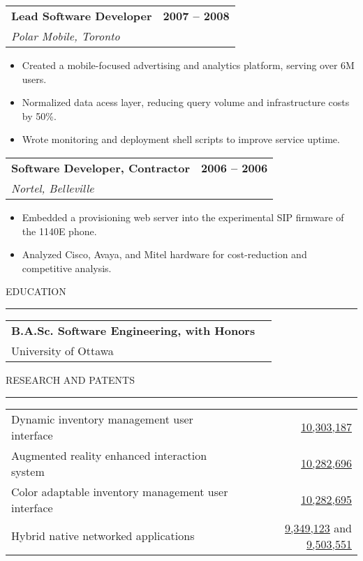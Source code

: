 \documentclass[12pt]{article}
\makeatletter
\newenvironment{justifycolumns}
{\begin{tabular*}{\textwidth}{@{\extracolsep{\fill}}lr@{}}}
{\end{tabular*}}
\newcommand{\row}[2]{#1 & #2 \\}
\newcommand{\rowheading}[2]{\row{\textbf{#1}}{\textbf{#2}}}
\newcommand{\range}[2]{#1 -- #2}
\newcommand{\blockseparation}{\vspace{0.15in}}
\newcommand{\heading}[1]{
	\blockseparation
	\uppercase{#1}
	\vspace{0.05in}
	\hrule
	\blockseparation
}
\newenvironment{tightbullets}
{\begin{itemize}}
{\end{itemize}}
\newenvironment{bullets}
{\begin{tightbullets}}
{\end{tightbullets} \blockseparation}
\makeatother
\begin{document}
\begin{flushleft}
\begin{justifycolumns}
	\rowheading{Lead Software Developer}{\range{2007}{2008}}
	\row{\emph{Polar Mobile, Toronto}}{}
\end{justifycolumns}
\begin{bullets}
	\item Created a mobile-focused advertising and analytics platform, serving over 6M users.
	\item Normalized data acess layer, reducing query volume and infrastructure costs by 50\%.
	\item Wrote monitoring and deployment shell scripts to improve service uptime.
\end{bullets}

\begin{justifycolumns}
	\rowheading{Software Developer, Contractor}{\range{2006}{2006}}
	\row{\emph{Nortel, Belleville}}{}
\end{justifycolumns}
\begin{bullets}
	\item Embedded a provisioning web server into the experimental SIP firmware of the 1140E phone.
	\item Analyzed Cisco, Avaya, and Mitel hardware for cost-reduction and competitive analysis.
\end{bullets}


\heading{Education}

\begin{justifycolumns}
	\rowheading{B.A.Sc. Software Engineering, with Honors}{}
	\row{University of Ottawa}{}
\end{justifycolumns}

\blockseparation


\heading{Research and Patents}

\begin{justifycolumns}
	\row{Dynamic inventory management user interface}
	{\href{http://patft.uspto.gov/netacgi/nph-Parser?Sect1=PTO1\&Sect2=HITOFF\&d=PALL\&p=1\&u=\%2Fnetahtml\%2FPTO\%2Fsrchnum.htm\&r=1\&f=G\&l=50\&s1=10,303,187.PN.\&OS=PN/10,303,187\&RS=PN/10,303,187}{10,303,187}}
   	\row{Augmented reality enhanced interaction system}
   	{\href{http://patft.uspto.gov/netacgi/nph-Parser?Sect1=PTO1\&Sect2=HITOFF\&d=PALL\&p=1\&u=\%2Fnetahtml\%2FPTO\%2Fsrchnum.htm\&r=1\&f=G\&l=50\&s1=10,282,696.PN.\&OS=PN/10,282,696\&RS=PN/10,282,696}{10,282,696}}
	\row{Color adaptable inventory management user interface}
	{\href{http://patft.uspto.gov/netacgi/nph-Parser?Sect1=PTO1\&Sect2=HITOFF\&d=PALL\&p=1\&u=\%2Fnetahtml\%2FPTO\%2Fsrchnum.htm\&r=1\&f=G\&l=50\&s1=10,282,695.PN.\&OS=PN/10,282,695\&RS=PN/10,282,695}{10,282,695}}
	\row{Hybrid native networked applications}
	{\href{http://patft.uspto.gov/netacgi/nph-Parser?Sect1=PTO1\&Sect2=HITOFF\&d=PALL\&p=1\&u=\%2Fnetahtml\%2FPTO\%2Fsrchnum.htm\&r=1\&f=G\&l=50\&s1=9,349,123.PN.\&OS=PN/9,349,123\&RS=PN/9,349,123}{9,349,123} and \href{http://patft.uspto.gov/netacgi/nph-Parser?Sect1=PTO1\&Sect2=HITOFF\&d=PALL\&p=1\&u=\%2Fnetahtml\%2FPTO\%2Fsrchnum.htm\&r=1\&f=G\&l=50\&s1=9,503,551.PN.\&OS=PN/9,503,551\&RS=PN/9,503,551}{9,503,551}}
\end{justifycolumns}


\end{flushleft}
\end{document}
